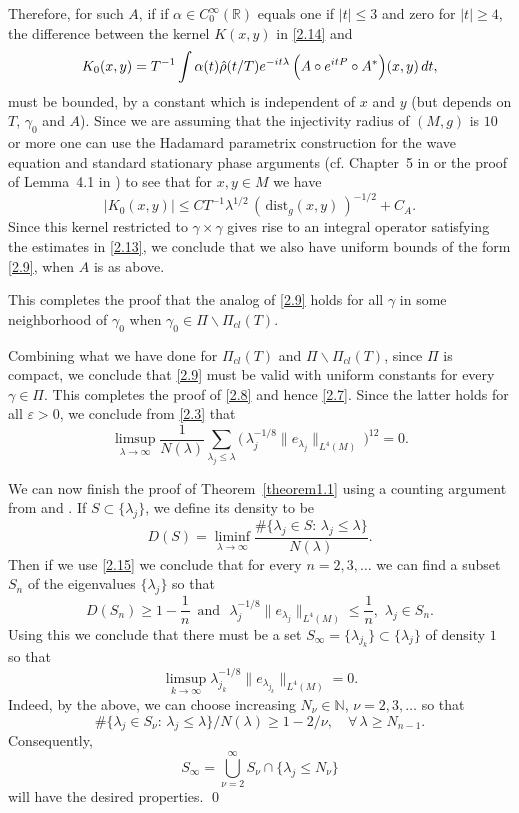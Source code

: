 \documentclass[10pt]{amsart}
\begin{document}
Therefore, for such $A$, if 
if $\alpha\in
C^\infty_0({\mathbb R})$ equals one if $|t|\le 3$ and zero for
$|t|\ge4$, the difference between the kernel $K(x,y)$ in \eqref{2.14} and
$$K_0(x,y)=T^{-1}\int \alpha(t) \Hat \rho(t/T) e^{-it{\lambda}}\, \Bigl(
A\circ e^{itP}\circ A^*\Bigr)(x,y)\, dt,
$$
must be bounded, by a constant 
which is independent of $x$ and $y$ (but depends on $T$, $\gamma_0$ and $A$).
 Since we are assuming that the injectivity radius of
$(M,g)$ is $10$ or more one can use the Hadamard parametrix
construction for the wave equation and standard stationary phase
arguments (cf. Chapter~5 in \cite{soggebook} or the proof of
Lemma~4.1 in \cite{burq}) to see that for $x,y\in M$ we have
$$|K_0(x,y)|\le CT^{-1}\lambda^{1/2}\, (\, \text{dist}_g(x,y)\, )^{-1/2}+C_A.$$
Since this kernel restricted
to $\gamma\times \gamma$ gives rise to an integral operator satisfying the estimates
in \eqref{2.13}, we conclude that we also have uniform bounds of the
form \eqref{2.9}, when $A$ is as above.

This completes the proof that the analog of \eqref{2.9} holds for all
$\gamma$ in some neighborhood of $\gamma_0$ when $\gamma_0\in
{\varPi} \backslash {\varPi}_{cl}(T)$.

Combining what we have done for ${\varPi}_{cl}(T)$ and ${\varPi}\backslash
{\varPi}_{cl}(T)$, since ${\varPi}$ is compact, we conclude that \eqref{2.9}
must be valid with uniform constants for every $\gamma\in {\varPi}$.
This completes the proof of \eqref{2.8} and hence \eqref{2.7}.
Since the latter holds for all $\varepsilon>0$, we conclude from
\eqref{2.3} that
\begin{equation}\label{2.15}
\limsup_{\lambda\to\infty}\frac1{N(\lambda)}\sum_{{\lambda}_j\le {\lambda}}\bigl(\,
{\lambda}_j^{-1/8}\|e_{{\lambda}_j}\|_{L^4(M)}\, \bigr)^{12}=0.
\end{equation}

We can now finish the proof of Theorem~\ref{theorem1.1} using a counting
argument from \cite{cdv} and \cite{zelditch}.  If $S\subset\{ \lambda_j \}$,
we define its density to be
$$D(S)=\liminf_{{\lambda}\to \infty}\frac{\#\{{\lambda}_j\in S: \, {\lambda}_j\le {\lambda}\}}{N({\lambda})}.$$
Then if we use \eqref{2.15} we conclude that for every $n=2,3,\dots$ we can
find a subset $S_n$ of the eigenvalues $\{{\lambda}_j\}$ so that
$$D(S_n)\ge 1-\frac1n \, \, \, \text{and } \, \,
{\lambda}_j^{-1/8}\|e_{{\lambda}_j}\|_{L^4(M)}\le \frac1n, \, \, {\lambda}_j\in S_n.$$
Using this we conclude that there must be a set $S_\infty
=\{{\lambda}_{j_k}\}\subset \{{\lambda}_j\}$ of density $1$ so that
$$\limsup_{k\to\infty}{\lambda}_{j_k}^{-1/8}\|e_{{\lambda}_{j_k}}\|_{L^4(M)}=0.$$
Indeed, by the above, we can choose increasing $N_\nu\in {\mathbb N}$,
$\nu=2,3,\dots$ so that
$$ \#\{{\lambda}_j\in S_\nu: \, {\lambda}_j\le {\lambda}\}/N({\lambda})\ge 1-2/\nu, \quad \forall \, {\lambda}\ge N_{n-1}.$$
Consequently,
$$S_\infty =\bigcup_{\nu=2}^\infty S_\nu \cap \{{\lambda}_j \le N_\nu\}$$
will have the desired properties. \qed
\end{document}
